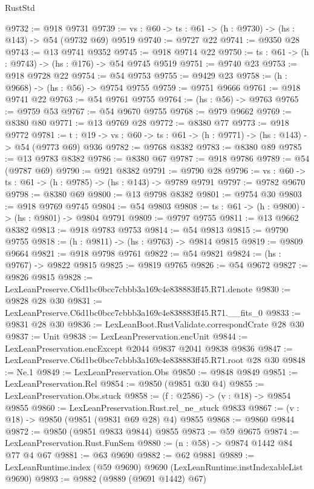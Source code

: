 \begin{lexlean}{RustStd}
\begin{coremodule}
@9732 := @918 @9731
@9739 := {vs : @60} -> {ts : @61} -> (h : @9730) -> (hs : @143) -> @54 (@9732 @69) @9519
@9740 := @9727 @22
@9741 := @9350 @28
@9743 := @13 @9741 @9352
@9745 := @918 @9714 @22
@9750 := {ts : @61} -> (h : @9743) -> (hs : @176) -> @54 @9745 @9519
@9751 := @9740 @23
@9753 := @918 @9728 @22
@9754 := @54 @9753
@9755 := @9429 @23
@9758 := (h : @9668) -> (hs : @56) -> @9754 @9755
@9759 := @9751 @9666
@9761 := @918 @9741 @22
@9763 := @54 @9761 @9755
@9764 := (hs : @56) -> @9763
@9765 := @9759 @53
@9767 := @54 @9670 @9755
@9768 := @979 @9662
@9769 := @8380 @80
@9771 := @13 @9769 @28
@9772 := @8380 @77
@9773 := @918 @9772
@9781 := {t : @19} -> {vs : @60} -> {ts : @61} -> (h : @9771) -> (hs : @143) -> @54 (@9773 @69) @936
@9782 := @9768 @8382
@9783 := @8380 @89
@9785 := @13 @9783 @8382
@9786 := @8380 @67
@9787 := @918 @9786
@9789 := @54 (@9787 @69)
@9790 := @921 @8382
@9791 := @9790 @28
@9796 := {vs : @60} -> {ts : @61} -> (h : @9785) -> (hs : @143) -> @9789 @9791
@9797 := @9782 @9670
@9798 := @8380 @69
@9800 := @13 @9798 @8382
@9801 := @9754 @30
@9803 := @918 @9769 @9745
@9804 := @54 @9803
@9808 := {ts : @61} -> (h : @9800) -> (hs : @9801) -> @9804 @9791
@9809 := @9797 @9755
@9811 := @13 @9662 @8382
@9813 := @918 @9783 @9753
@9814 := @54 @9813
@9815 := @9790 @9755
@9818 := (h : @9811) -> (hs : @9763) -> @9814 @9815
@9819 := @9809 @9664
@9821 := @918 @9798 @9761
@9822 := @54 @9821
@9824 := (hs : @9767) -> @9822 @9815
@9825 := @9819 @9765
@9826 := @54 @9672
@9827 := @9826 @9815
@9828 := LexLeanPreserve.C6d1bc0bcc7cbbb3a169c4e838883ff45.R71.denote
@9830 := @9828 @28 @30
@9831 := LexLeanPreserve.C6d1bc0bcc7cbbb3a169c4e838883ff45.R71.__fits_0
@9833 := @9831 @28 @30
@9836 := LexLeanBoot.RustValidate.correspondCrate @28 @30
@9837 := Unit
@9838 := LexLeanPreservation.encUnit
@9844 := LexLeanPreservation.encExcept @2044 @9837 @2041 @9838 @9836
@9847 := LexLeanPreserve.C6d1bc0bcc7cbbb3a169c4e838883ff45.R71.root @28 @30
@9848 := Ne.{1}
@9849 := LexLeanPreservation.Obs
@9850 := @9848 @9849
@9851 := LexLeanPreservation.Rel
@9854 := @9850 (@9851 @30 @4)
@9855 := LexLeanPreservation.Obs.stuck
@9858 := (f : @2586) -> (v : @18) -> @9854 @9855
@9860 := LexLeanPreservation.Rust.rel_ne_stuck @9833
@9867 := (v : @18) -> @9850 (@9851 (@9831 @69 @28) @4) @9855
@9868 := @9860 @9844
@9872 := @9850 (@9851 @9833 @9844) @9855
@9873 := @59 @9675
@9874 := LexLeanPreservation.Rust.FunSem
@9880 := (n : @58) -> @9874 @1442 @84 @77 @4 @67
@9881 := @63 @9690
@9882 := @62 @9881
@9889 := LexLeanRuntime.index (@59 @9690) @9690 (LexLeanRuntime.instIndexableList @9690)
@9893 := @9882 (@9889 (@9691 @1442) @67)

\end{coremodule}
\end{lexlean}
